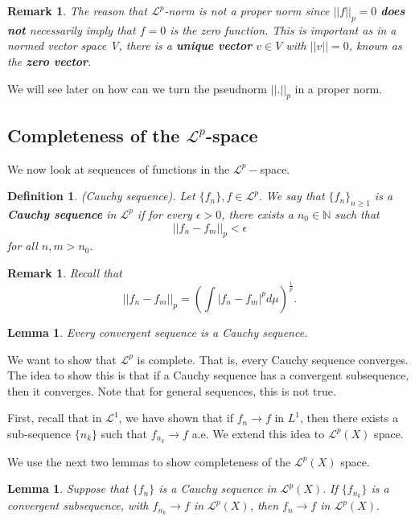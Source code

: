 \documentclass[twoside]{article}
\newtheorem{lemma}[theorem]{Lemma}
\newtheorem{definition}[theorem]{Definition}
\newtheorem{remark}[theorem]{Remark}
\begin{document}
\begin{remark}The reason that $\mathcal{L}^p$-norm is not a proper norm since $||f||_p = 0$ \textbf{does not} necessarily imply that $f = 0$ is the zero function. This is important as in a normed vector space V, there is a \textbf{unique vector} $v \in V$ with $||v|| = 0$, known as the \textbf{zero vector}.
\end{remark}

We will see later on how can we turn the pseudnorm $||.||_p$ in a proper norm.

\subsection{Completeness of the $\mathcal{L}^p$-space}
We now look at sequences of functions in the $\mathcal{L}^p-$space.

\begin{definition}(Cauchy sequence). Let $\{f_n\}, f \in \mathcal{L}^p.$ We say that $\{f_n\}_{n \geq 1}$ is a \textbf{Cauchy sequence} in $\mathcal{L}^p$ if for every $\epsilon > 0$, there exists a $n_0 \in \mathbb{N}$ such that 
$$
||f_n - f_m||_p < \epsilon 
$$
for all $n, m > n_0.$
\end{definition}
\begin{remark}Recall that 
$$
||f_n - f_m||_p = (\int|f_n - f_m|^pd\mu)^{\frac{1}{p}}.
$$
\end{remark}

\begin{lemma}Every convergent sequence is a Cauchy sequence.
\end{lemma}

We want to show that $\mathcal{L}^p$ is complete. That is, every Cauchy sequence converges. The idea to show this is that if a Cauchy sequence has a convergent subsequence, then it converges. Note that for general sequences, this is not true.

First, recall that in $\mathcal{L}^1$, we have shown that if $f_n \rightarrow f$ in $L^1$, then there exists a sub-sequence $\{n_k\}$ such that $f_{n_{k}} \rightarrow f$ a.e. We extend this idea to $\mathcal{L}^p(X)$ space.

We use the next two lemmas to show completeness of the $\mathcal{L}^p(X)$ space.
\begin{lemma}Suppose that $\{f_n\}$ is a Cauchy sequence in $\mathcal{L}^p(X).$ If $\{f_{n_{k}}\}$ is a convergent subsequence, with $f_{n_{k}} \rightarrow f$ in $\mathcal{L}^p(X)$, then $f_n \rightarrow f$ in $\mathcal{L}^p(X).$
\end{lemma}
\end{document}
